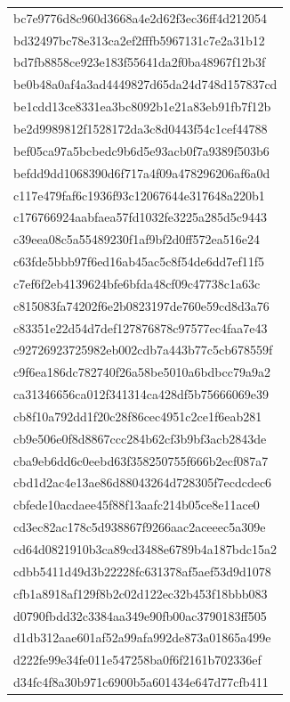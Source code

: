 \begin{tabular}{l}
bc7e9776d8c960d3668a4e2d62f3ec36ff4d212054 \\
bd32497bc78e313ca2ef2fffb5967131c7e2a31b12 \\
bd7fb8858ce923e183f55641da2f0ba48967f12b3f \\
be0b48a0af4a3ad4449827d65da24d748d157837cd \\
be1cdd13ce8331ea3bc8092b1e21a83eb91fb7f12b \\
be2d9989812f1528172da3c8d0443f54c1cef44788 \\
bef05ca97a5bcbedc9b6d5e93acb0f7a9389f503b6 \\
befdd9dd1068390d6f717a4f09a478296206af6a0d \\
c117e479faf6c1936f93c12067644e317648a220b1 \\
c176766924aabfaea57fd1032fe3225a285d5c9443 \\
c39eea08c5a55489230f1af9bf2d0ff572ea516e24 \\
c63fde5bbb97f6ed16ab45ac5c8f54de6dd7ef11f5 \\
c7ef6f2eb4139624bfe6bfda48cf09c47738c1a63c \\
c815083fa74202f6e2b0823197de760e59cd8d3a76 \\
c83351e22d54d7def127876878c97577ec4faa7e43 \\
c92726923725982eb002cdb7a443b77c5cb678559f \\
c9f6ea186dc782740f26a58be5010a6bdbcc79a9a2 \\
ca31346656ca012f341314ca428df5b75666069e39 \\
cb8f10a792dd1f20c28f86cec4951c2ce1f6eab281 \\
cb9e506e0f8d8867ccc284b62cf3b9bf3acb2843de \\
cba9eb6dd6c0eebd63f358250755f666b2ecf087a7 \\
cbd1d2ac4e13ae86d88043264d728305f7ecdcdec6 \\
cbfede10acdaee45f88f13aafc214b05ce8e11ace0 \\
cd3ec82ac178c5d938867f9266aac2aceeec5a309e \\
cd64d0821910b3ca89cd3488e6789b4a187bdc15a2 \\
cdbb5411d49d3b22228fc631378af5aef53d9d1078 \\
cfb1a8918af129f8b2c02d122ec32b453f18bbb083 \\
d0790fbdd32c3384aa349e90fb00ac3790183ff505 \\
d1db312aae601af52a99afa992de873a01865a499e \\
d222fe99e34fe011e547258ba0f6f2161b702336ef \\
d34fc4f8a30b971c6900b5a601434e647d77cfb411 \\

\end{tabular}
